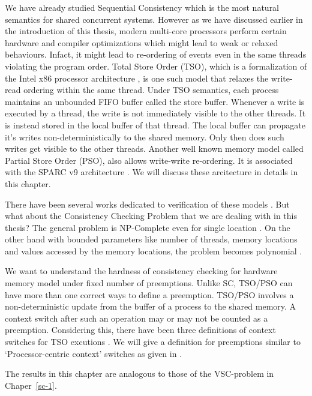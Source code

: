We have already studied Sequential Consistency which is the most natural semantics for shared concurrent systems. However as we have discussed earlier in the introduction of this thesis, modern multi-core processors perform certain hardware and compiler optimizations which might lead to weak or relaxed behaviours. Infact, it might lead to re-ordering of events even in the same threads violating the program order. Total Store Order  (TSO), which is a formalization
of the Intel x86 processor  architecture \cite{Sewell:2010}, is one such model that relaxes the write-read ordering within the same thread. Under TSO semantics, each process maintains an unbounded FIFO buffer called the store buffer. Whenever a write is executed by a thread, the write is not immediately visible to the other threads. It is instead stored in the local buffer of that thread. The local buffer can propagate it’s writes non-deterministically
to the shared memory. Only then does such writes get visible to the other threads. Another well known memory model called Partial Store Order (PSO),  also allows write-write re-ordering. It is associated with the SPARC v9 architecture \cite{sparc1994architecture}. We will discuss these arcitecture in details in this chapter. 

There have been several works dedicated to verification of these models \cite{DBLP:journals/acta/AbdullaAAJLS17}\cite{10.1145/1707801.1706303}\cite{tso_rf_bui2021reads}\cite{zhao2023satisfiability}. But what about the Consistency Checking Problem that we are dealing with in this thesis? The general problem is NP-Complete even for single location  \cite{CantinLS05}. On the other hand with bounded parameters like number of threads, memory locations and values accessed by the memory locations, the problem becomes polynomial \cite{ChakrabortyKMP24}.  

We want to understand  the hardness of consistency checking for hardware memory model under fixed number of preemptions.
 Unlike SC, TSO/PSO can have more than one correct ways to define a preemption. TSO/PSO involves a non-deterministic update from the buffer of a process to the shared memory. A context switch after such an operation may or may not be counted as a preemption. Considering this, there have been three definitions of context switches for TSO excutions \cite{TSO-context-bounding}. We will give a definition for preemptions similar to `Processor-centric context' switches as given in \cite{TSO-context-bounding}. 
 
The results in this chapter are analogous to those of the VSC-problem in  Chaper~\ref{sc-1}.  


